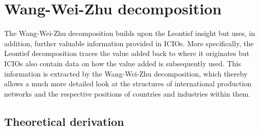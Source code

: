 \documentclass[a4paper]{article}\usepackage[]{graphicx}\usepackage[]{color}
\begin{document}
\section{Wang-Wei-Zhu decomposition}

\label{sec:wwz} The Wang-Wei-Zhu decomposition builds upon the Leontief
insight but uses, in addition, further valuable information provided
in ICIOs. More specifically, the Leontief decomposition traces the
value added back to where it originates but ICIOs also contain data
on how the value added is subsequently used. This information is extracted
by the Wang-Wei-Zhu decomposition, which thereby allows a much more
detailed look at the structures of international production networks
and the respective positions of countries and industries within them.

\subsection{Theoretical derivation}
\end{document}
